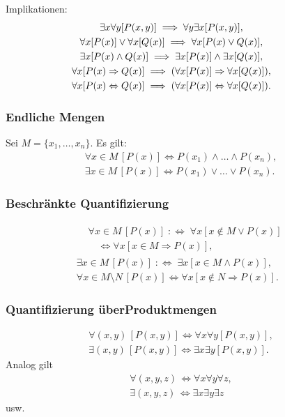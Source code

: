Implikationen:
\begin{gather}
\hspace{-2em}\exists x\forall y[P(x,y)]\implies \forall y\exists x[P(x,y)],\\
\hspace{-2em}\forall x[P(x)]\lor\forall x[Q(x)]\implies\forall x[P(x)\lor Q(x)],\\
\hspace{-2em}\exists x[P(x)\land Q(x)]\implies
  \exists x[P(x)]\land \exists x[Q(x)],\\
\hspace{-2em}\forall x[P(x)\Rightarrow Q(x)]\implies
  (\forall x[P(x)]\Rightarrow\forall x[Q(x)]),\\
\hspace{-2em}\forall x[P(x)\Leftrightarrow Q(x)]\implies
  (\forall x[P(x)]\Leftrightarrow\forall x[Q(x)]).
\end{gather}

\newpage
\subsubsection{Endliche Mengen}
Sei $M=\{x_1,\ldots,x_n\}$. Es gilt:
\begin{gather}
\forall x{\in}M\,[P(x)]\iff P(x_1)\land\ldots\land P(x_n),\\
\exists x{\in}M\,[P(x)]\iff P(x_1)\lor\ldots\lor P(x_n).
\end{gather}

\subsubsection{Beschränkte Quantifizierung}
\begin{gather}
\begin{split}
& \forall x{\in}M\,[P(x)]\;:\Longleftrightarrow\;\forall x[x\notin M\lor P(x)]\\
& \quad\iff\forall x[x\in M\Rightarrow P(x)],
\end{split}\\
\exists x{\in}M\,[P(x)]\;:\Longleftrightarrow\;\exists x[x\in M\land P(x)],\\
\forall x{\in}M{\setminus}N\,[P(x)]\iff \forall x[x\notin N\Rightarrow P(x)].
\end{gather}

\subsubsection[Quantifizierung über Produktmengen]%
{Quantifizierung über\newline Produktmengen}
\begin{gather}
\forall(x,y)\,[P(x,y)]\iff \forall x\forall y[P(x,y)],\\
\exists(x,y)\,[P(x,y)]\iff \exists x\exists y[P(x,y)].
\end{gather}
Analog gilt
\begin{gather}
\forall(x,y,z)\,\iff \forall x\forall y\forall z,\\
\exists(x,y,z)\,\iff \exists x\exists y\exists z
\end{gather}
usw.

